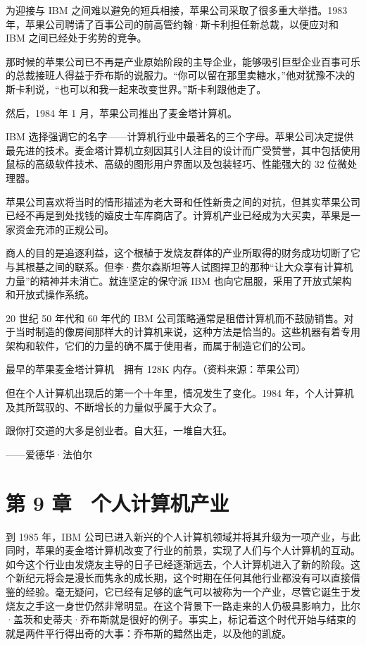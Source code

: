 \documentclass[12pt,UTF8]{ctexbook}
\begin{document}
为迎接与 IBM 之间难以避免的短兵相接，苹果公司采取了很多重大举措。1983 年，苹果公司聘请了百事公司的前高管约翰·斯卡利担任新总裁，以便应对和 IBM 之间已经处于劣势的竞争。

那时候的苹果公司已不再是产业原始阶段的主导企业，能够吸引巨型企业百事可乐的总裁接班人得益于乔布斯的说服力。“你可以留在那里卖糖水，”他对犹豫不决的斯卡利说，“也可以和我一起来改变世界。”斯卡利跟他走了。

然后，1984 年 1 月，苹果公司推出了麦金塔计算机。

IBM 选择强调它的名字——计算机行业中最著名的三个字母。苹果公司决定提供最先进的技术。麦金塔计算机立刻因其引人注目的设计而广受赞誉，其中包括使用鼠标的高级软件技术、高级的图形用户界面以及包装轻巧、性能强大的 32 位微处理器。

苹果公司喜欢将当时的情形描述为老大哥和任性新贵之间的对抗，但其实苹果公司已经不再是到处找钱的嬉皮士车库商店了。计算机产业已经成为大买卖，苹果是一家资金充沛的正规公司。

商人的目的是追逐利益，这个根植于发烧友群体的产业所取得的财务成功切断了它与其根基之间的联系。但李·费尔森斯坦等人试图捍卫的那种“让大众享有计算机力量”的精神并未消亡。就连坚定的保守派 IBM 也向它屈服，采用了开放式架构和开放式操作系统。

20 世纪 50 年代和 60 年代的 IBM 公司策略通常是租借计算机而不鼓励销售。对于当时制造的像房间那样大的计算机来说，这种方法是恰当的。这些机器有着专用架构和软件，它们的力量的确不属于使用者，而属于制造它们的公司。



最早的苹果麦金塔计算机　拥有 128K 内存。（资料来源：苹果公司）

但在个人计算机出现后的第一个十年里，情况发生了变化。1984 年，个人计算机及其所驾驭的、不断增长的力量似乎属于大众了。





跟你打交道的大多是创业者。自大狂，一堆自大狂。

——爱德华·法伯尔





\chapter{第 9 章　个人计算机产业}


到 1985 年，IBM 公司已进入新兴的个人计算机领域并将其升级为一项产业，与此同时，苹果的麦金塔计算机改变了行业的前景，实现了人们与个人计算机的互动。如今这个行业由发烧友主导的日子已经逐渐远去，个人计算机进入了新的阶段。这个新纪元将会是漫长而隽永的成长期，这个时期在任何其他行业都没有可以直接借鉴的经验。毫无疑问，它已经有足够的底气可以被称为一个产业，尽管它诞生于发烧友之手这一身世仍然非常明显。在这个背景下一路走来的人仍极具影响力，比尔·盖茨和史蒂夫·乔布斯就是很好的例子。事实上，标记着这个时代开始与结束的就是两件平行得出奇的大事：乔布斯的黯然出走，以及他的凯旋。
\end{document}
